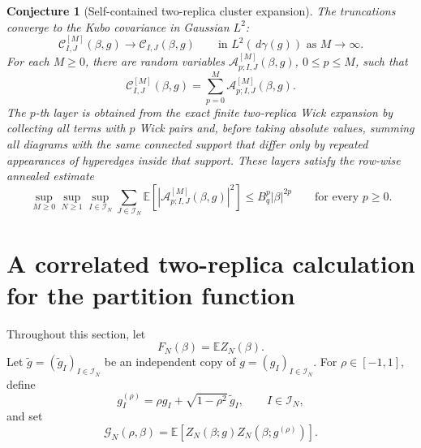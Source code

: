 \documentclass[11pt]{article}
\newtheorem{conjecture}[theorem]{Conjecture}
\newcommand{\E}{\mathbb{E}}
\newcommand{\calI}{\mathcal{I}}
\newcommand{\dd}{\,d}
\begin{document}
\begin{conjecture}[Self-contained two-replica cluster expansion]
  The truncations converge to the Kubo covariance in Gaussian $L^2$:
  \begin{equation}\label{eq:final-conj-convergence}
    \mathcal C^{[M]}_{I,J}(\beta,g)
    \to
    \mathcal C_{I,J}(\beta,g)
    \qquad
    \text{in }L^2(\dd\gamma(g))
    \text{ as }M\to\infty.
  \end{equation}
  For each $M\geq0$, there are random variables
  $\mathcal A^{[M]}_{p;I,J}(\beta,g)$, $0\leq p\leq M$, such that
  \begin{equation}\label{eq:final-conj-layer-decomposition}
    \mathcal C^{[M]}_{I,J}(\beta,g)
    =
    \sum_{p=0}^M
    \mathcal A^{[M]}_{p;I,J}(\beta,g).
  \end{equation}
  The $p$-th layer is obtained from the exact finite two-replica Wick expansion
  by collecting all terms with $p$ Wick pairs and, before taking absolute
  values, summing all diagrams with the same connected support that differ only
  by repeated appearances of hyperedges inside that support.  These layers
  satisfy the row-wise annealed estimate
  \begin{equation}\label{eq:final-conj-layer-bound}
    \sup_{M\geq0}
    \sup_{N\geq1}
    \sup_{I\in\calI_N}
    \sum_{J\in\calI_N}
    \E\left[
      \left|
        \mathcal A^{[M]}_{p;I,J}(\beta,g)
      \right|^2
    \right]
    \leq
    B_q^p|\beta|^{2p}
    \qquad
    \text{for every }p\geq0.
  \end{equation}
\end{conjecture}

\section{A correlated two-replica calculation for the partition function}
\label{sec:partition-function-second-moment}

Throughout this section, let
\begin{equation}\label{eq:annealed-partition-function}
  F_N(\beta)=\E Z_N(\beta).
\end{equation}
Let $\widetilde g=(\widetilde g_I)_{I\in\calI_N}$ be an independent copy of
$g=(g_I)_{I\in\calI_N}$.  For $\rho\in[-1,1]$, define
\begin{equation}\label{eq:rho-correlated-disorder}
  g_I^{(\rho)}
  =
  \rho g_I+\sqrt{1-\rho^2}\,\widetilde g_I,
  \qquad I\in\calI_N,
\end{equation}
and set
\begin{equation}\label{eq:rho-correlated-second-moment}
  \mathcal G_N(\rho,\beta)
  =
  \E\left[
    Z_N(\beta;g)Z_N(\beta;g^{(\rho)})
  \right].
\end{equation}
\end{document}
